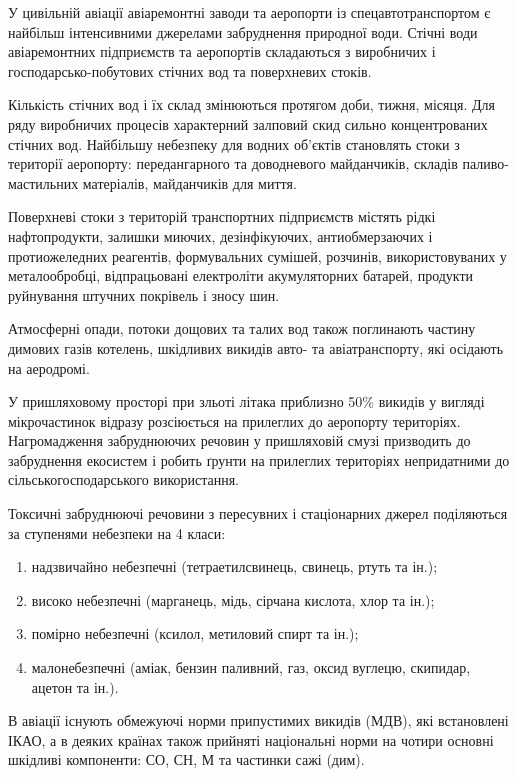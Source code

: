 У цивільній авіації авіаремонтні заводи та аеропорти із спецавтотранспортом є найбільш інтенсивними 
джерелами забруднення природної води. Стічні води авіаремонтних підприємств та аеропортів складаються 
з виробничих і господарсько-побутових стічних вод та поверхневих стоків. 

Кількість стічних вод і їх склад змінюються протягом доби, тижня, місяця. Для ряду виробничих 
процесів характерний залповий скид сильно концентрованих стічних вод. Найбільшу небезпеку для 
водних об’єктів становлять стоки з території аеропорту: передангарного та доводневого майданчиків, 
складів паливо-мастильних матеріалів, майданчиків для миття. 

Поверхневі стоки з територій транспортних підприємств містять рідкі нафтопродукти, залишки миючих, 
дезінфікуючих, антиобмерзаючих і протиожеледних реагентів, формувальних сумішей, розчинів, 
використовуваних у металообробці, відпрацьовані електроліти акумуляторних батарей, продукти 
руйнування штучних покрівель і зносу шин. 

Атмосферні опади, потоки дощових та талих вод також поглинають частину димових газів котелень, 
шкідливих викидів авто- та авіатранспорту, які осідають на аеродромі. 

У пришляховому просторі при зльоті літака приблизно 50\% викидів у вигляді мікрочастинок відразу 
розсіюється на прилеглих до аеропорту територіях. Нагромадження забруднюючих речовин у пришляховій 
смузі призводить до забруднення екосистем і робить ґрунти на прилеглих територіях непридатними до 
сільськогосподарського використання. 

Токсичні забруднюючі речовини з пересувних і стаціонарних джерел поділяються за ступенями небезпеки на 4 класи: 
\begin{enumerate}
 \item надзвичайно небезпечні (тетраетилсвинець, свинець, ртуть та ін.); 
 \item високо небезпечні (марганець, мідь, сірчана кислота, хлор та ін.); 
 \item помірно небезпечні (ксилол, метиловий спирт та ін.); 
 \item малонебезпечні (аміак, бензин паливний, газ, оксид вуглецю, скипидар, ацетон та ін.).
\end{enumerate}


В авіації існують обмежуючі норми припустимих викидів (МДВ), які встановлені ІКАО, а в деяких 
країнах також прийняті національні норми на чотири основні шкідливі компоненти: СО, СН, М та частинки сажі (дим).

